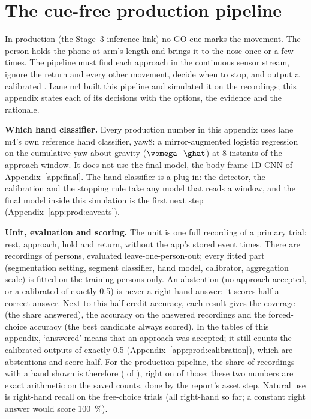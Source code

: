 \section{The cue-free production pipeline}\label{app:prod}

In production (the Stage~3 inference link) no GO cue marks the movement.
The person holds the phone at arm's length and brings it to the nose once or a few times.
The pipeline must find each approach in the continuous sensor stream, ignore the return and every other movement, decide when to stop, and output a calibrated \pright{}.
Lane m4 built this pipeline and simulated it on the recordings; this appendix states each of its decisions with the options, the evidence and the rationale.

\textbf{Which hand classifier.}
Every production number in this appendix uses lane m4's own reference hand classifier, yaw8: a mirror-augmented logistic regression on the cumulative yaw about gravity ($\vomega\cdot\ghat$) at 8 instants of the approach window.
It does not use the final model, the body-frame 1D CNN of Appendix~\ref{app:final}.
The hand classifier is a plug-in: the detector, the calibration and the stopping rule take any model that reads a window, and the final model inside this simulation is the first next step (Appendix~\ref{app:prod:caveats}).

\textbf{Unit, evaluation and scoring.}
The unit is one full recording of a primary trial: rest, approach, hold and return, without the app's stored event times.
There are  recordings of  persons, evaluated leave-one-person-out; every fitted part (segmentation setting, segment classifier, hand model, calibrator, aggregation scale) is fitted on the training persons only.
An abstention (no approach accepted, or a calibrated \pright{} of exactly 0.5) is never a right-hand answer: it scores half a correct answer.
Next to this half-credit accuracy, each result gives the coverage (the share answered), the accuracy on the answered recordings and the forced-choice accuracy (the best candidate always scored).
In the tables of this appendix, `answered' means that an approach was accepted; it still counts the calibrated outputs of exactly 0.5 (Appendix~\ref{app:prod:calibration}), which are abstentions and score half.
For the production pipeline, the share of recordings with a hand shown is therefore  ( of ), right on  of those; these two numbers are exact arithmetic on the saved counts, done by the report's asset step.
Natural use is right-hand recall on the free-choice trials (all right-hand so far; a constant right answer would score 100~\%).

